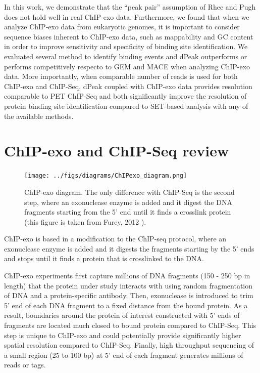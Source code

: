 \documentclass[11pt]{article}\usepackage[]{graphicx}\usepackage[]{color}
\begin{document}
In this work, we demonstrate that the ``peak pair'' assumption of
Rhee and Pugh \cite{exo1} does not hold well in real ChIP-exo
data. Furthermore, we found that when we analyze ChIP-exo data from
eukaryotic genomes, it is important to consider sequence biases
inherent to ChIP-exo data, such as mappability and GC content in order
to improve sensitivity and specificity of binding site
identification. We evaluated several method to identify binding events
and dPeak outperforms or performs competitively respecto to GEM and
MACE when analyzing ChIP-exo data. More importantly, when comparable
number of reads is used for both ChIP-exo and ChIP-Seq, dPeak coupled
with ChIP-exo data provides resolution comparable to PET ChIP-Seq and
both significantly improve the resolution of protein binding site
identification compared to SET-based analysis with any of the
available methods.

\section{ChIP-exo and ChIP-Seq review}
\label{sec:exo}

\begin{figure}
\centering
\texttt{[image: ../figs/diagrams/ChIPexo\_diagram.png]}
\caption{ChIP-exo diagram. The only difference with ChIP-Seq is the
  second step, where an exonuclease enzyme is added and it digest the
  DNA fragments starting from the 5' end until it finds a crosslink
  protein (this figure is taken from Furey, 2012 \cite{chipbeyond}).}
\label{fig:exo}
\end{figure}

ChIP-exo is based in a modification to the ChIP-seq protocol, where an
exonuclease enzyme is added and it digests the fragments starting by
the 5' ends and stops until it finds a protein that is crosslinked to
the DNA.

ChIP-exo experiments first capture millions of DNA fragments
(150 - 250 bp in length) that the protein under study interacts with
using random fragmentation of DNA and a protein-specific
antibody. Then, exonuclease is introduced to trim 5' end of each DNA
fragment to a fixed distance from the bound protein. As a result,
boundaries around the protein of interest constructed with 5' ends of
fragments are located much closed to bound protein compared to
ChIP-Seq. This step is unique to ChIP-exo and could potentially
provide significantly higher spatial resolution compared to
ChIP-Seq. Finally, high throughput sequencing of a small region (25 to
100 bp) at 5' end of each fragment generates millions of reads or
tags.
\end{document}
